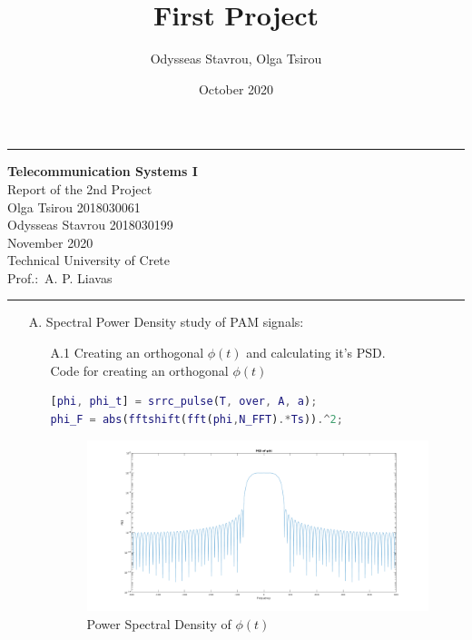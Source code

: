 \documentclass[12pt, a4paper]{article}
\title{First Project}
\author{Odysseas Stavrou, Olga Tsirou}
\date{October 2020}
\begin{document}
\noindent\rule{\textwidth}{1.5pt}

\begin{center}
{\bf Telecommunication Systems I} \\ 
 Report of the 2nd Project\\
 Olga Tsirou 2018030061\\
 Odysseas Stavrou 2018030199\\
 November 2020\\
 Technical University of Crete\\
 Prof.:\ A. P. Liavas 
\end{center}
\noindent\rule{\textwidth}{1.5pt}

\begin{enumerate}
    \item[A.] Spectral Power Density study of PAM signals:
    \begin{enumerate}
        \item[A.1] Creating an orthogonal \(\phi(t)\) and calculating it's PSD.\\
        Code for creating an orthogonal \(\phi(t)\)
        \begin{lstlisting}[language=MATLAB]
[phi, phi_t] = srrc_pulse(T, over, A, a);
phi_F = abs(fftshift(fft(phi,N_FFT).*Ts)).^2;
        \end{lstlisting}
        \begin{figure}[H]
            \centering
            \noindent\includegraphics[width=\textwidth]{PHI_PSD.png}
            \caption{Power Spectral Density of \(\phi(t)\)}
        \end{figure}


\end{enumerate}
\end{enumerate}
\end{document}
